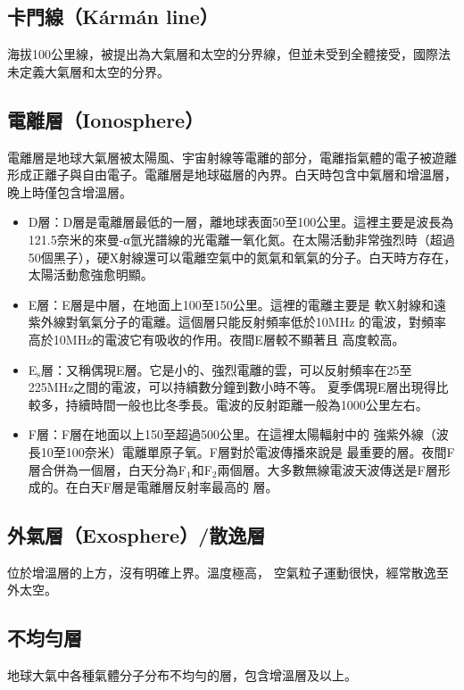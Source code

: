 \documentclass[a4paper,12pt]{report}
\begin{document}
\subsection{卡門線（Kármán line）}
海拔100公里線，被提出為大氣層和太空的分界線，但並未受到全體接受，國際法未定義大氣層和太空的分界。
\subsection{電離層（Ionosphere）}
電離層是地球大氣層被太陽風、宇宙射線等電離的部分，電離指氣體的電子被遊離形成正離子與自由電子。電離層是地球磁層的內界。白天時包含中氣層和增溫層，晚上時僅包含增溫層。
\begin{itemize}
  \item D層：D層是電離層最低的一層，離地球表面50至100公里。這裡主要是波長為121.5奈米的來曼-α氫光譜線的光電離一氧化氮。在太陽活動非常強烈時（超過50個黑子），硬X射線還可以電離空氣中的氮氣和氧氣的分子。白天時方存在，太陽活動愈強愈明顯。
  \item E層：E層是中層，在地面上100至150公里。這裡的電離主要是 軟X射線和遠紫外線對氧氣分子的電離。這個層只能反射頻率低於10MHz 的電波，對頻率高於10MHz的電波它有吸收的作用。夜間E層較不顯著且 高度較高。
  \item E$_\text{s}$層：又稱偶現E層。它是小的、強烈電離的雲，可以反射頻率在25至225MHz之間的電波，可以持續數分鐘到數小時不等。 夏季偶現E層出現得比較多，持續時間一般也比冬季長。電波的反射距離一般為1000公里左右。
  \item F層：F層在地面以上150至超過500公里。在這裡太陽輻射中的 強紫外線（波長10至100奈米）電離單原子氧。F層對於電波傳播來說是 最重要的層。夜間F層合併為一個層，白天分為F$_1$和F$_2$兩個層。大多數無線電波天波傳送是F層形成的。在白天F層是電離層反射率最高的 層。
\end{itemize}
\subsection{外氣層（Exosphere）/散逸層}
位於增溫層的上方，沒有明確上界。溫度極高， 空氣粒子運動很快，經常散逸至外太空。
\subsection{不均勻層}
地球大氣中各種氣體分子分布不均勻的層，包含增溫層及以上。
\end{document}
